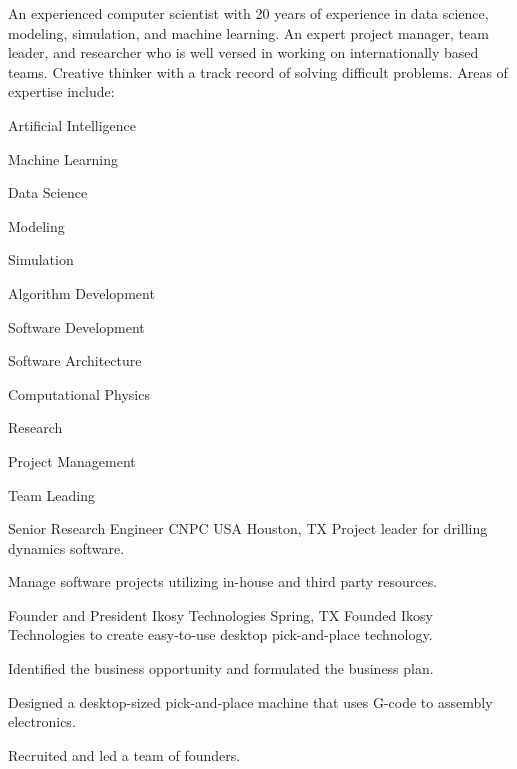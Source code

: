 \documentclass{leresume}
\begin{document}
	\thispagestyle{leempty}
	\makeresumeheaderC

	An experienced computer scientist with 20 years of experience in data science, modeling, simulation, and machine learning. An expert project manager, team leader, and researcher who is well versed in working on internationally based teams. Creative thinker with a track record of solving difficult problems. Areas of expertise include:
	\vspace{-6pt}
	\begin{multicols}{3}
		\begin{bulletedlist}
			
			\item Artificial Intelligence
			\item Machine Learning
			\item Data Science
			\item Modeling
			\item Simulation
			\item Algorithm Development
			\item Software Development
			\item Software Architecture
			\item Computational Physics
			\item Research
			\item Project Management
			\item Team Leading
		\end{bulletedlist}
		\end{multicols}

	
		
            {Senior Research Engineer}
            {CNPC USA}
			{Houston, TX}
			Project leader for drilling dynamics software.
		\begin{bulletedlist}
			
		\item
		
				Manage software projects utilizing in-house and third party resources.
			
		\end{bulletedlist}
	
            {Founder and President}
            {Ikosy Technologies}
			{Spring, TX}
			Founded Ikosy Technologies to create easy-to-use desktop pick-and-place technology.
		\begin{bulletedlist}
			
		\item
		
				Identified the business opportunity and formulated the business plan.
			
		\item
		
				Designed a desktop-sized pick-and-place machine that uses G-code to assembly electronics.
			
		\item
		
				Recruited and led a team of founders.
			
		\end{bulletedlist}
	
\end{document}
